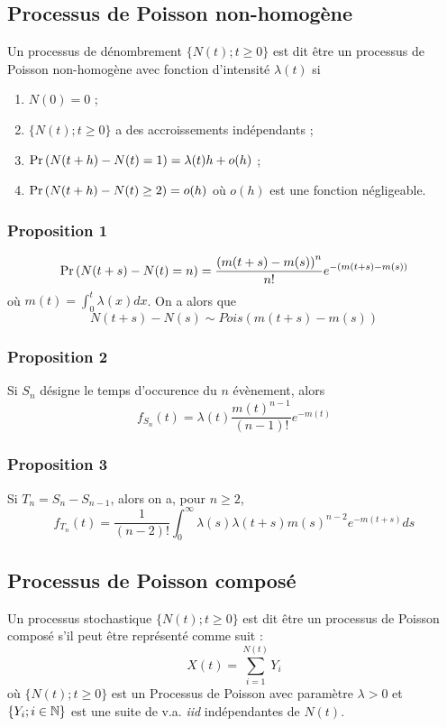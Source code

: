 \documentclass[10pt, french, landscape]{article}
\begin{document}
\begin{multicols*}{3}
\subsection*{Processus de Poisson non-homogène}
\begin{definition}[Définition]
Un processus de dénombrement $\{ N(t) ; t \geq 0 \}$ est dit être un processus de Poisson non-homogène avec fonction d'intensité $\lambda(t)$ si
\begin{enumerate}[label=(\arabic*)]
\item $N(0) = 0$ ;
\item $\{ N(t) ; t \geq 0 \}$ a des accroissements indépendants ;
\item $\Pr \left( N(t+h) - N(t) = 1 \right) = \lambda(t) h + o(h)$ ;
\item $\Pr \left( N(t+h) - N(t) \geq 2 \right) = o(h)$ où $o(h)$ est une fonction négligeable.
\end{enumerate}
\end{definition}

\subsubsection*{Proposition 1}
\[\Pr \left( N(t+s) - N(t) = n \right)  = \frac{\left(m(t+s) - m(s) \right)^n}{n!} e^{-(m(t+s) - m(s))} \]
où $m(t) = \int_{0}^{t} \lambda(x) dx$. On a alors que
\[N(t+s) - N(s) \sim Pois(m(t+s) - m(s))\]


\subsubsection*{Proposition 2}
Si $S_n$ désigne le temps d'occurence du $n$ évènement, alors
\[f_{S_n}(t) = \lambda(t) \frac{m(t)^{n-1}}{(n-1)!} e^{-m(t)} \]

\subsubsection*{Proposition 3}
Si $T_n = S_{n} - S_{n-1}$, alors on a, pour $n \geq 2$,
\[f_{T_n}(t) = \frac{1}{(n-2)!} \int_{0}^{\infty} \lambda(s) \lambda(t+s) m(s)^{n-2} e^{-m(t+s)} ds \]

\subsection*{Processus de Poisson composé}
\begin{definition}[Définition]
Un processus stochastique $\{ N(t) ; t \geq 0  \}$ est dit être un processus de Poisson composé s'il peut être représenté comme suit : 
\[X(t) = \sum_{i=1}^{N(t)} Y_i\]
où $\{ N(t) ; t \geq 0  \}$ est un Processus de Poisson avec paramètre $\lambda > 0$ et $\{ Y_i ; i \in \mathbb{N} \}$ est une suite de v.a. \emph{iid} indépendantes de $N(t)$.
\end{definition}


\end{multicols*}
\end{document}
